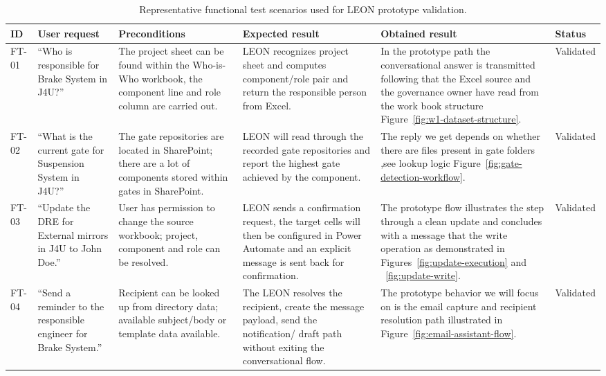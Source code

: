 \begin{table}[H]
\centering
\footnotesize
\renewcommand{\arraystretch}{1.25}
\caption{Representative functional test scenarios used for LEON prototype validation.}
\label{tab:functional-validation-scenarios}
\begin{tabularx}{\textwidth}{|p{0.9cm}|p{2.9cm}|p{2.6cm}|X|X|p{1.8cm}|}
\hline
\rowcolor[HTML]{E6F2FF}\textcolor[HTML]{003D99}{\textbf{ID}} & \textcolor[HTML]{003D99}{\textbf{User request}} & \textcolor[HTML]{003D99}{\textbf{Preconditions}} & \textcolor[HTML]{003D99}{\textbf{Expected result}} & \textcolor[HTML]{003D99}{\textbf{Obtained result}} & \textcolor[HTML]{003D99}{\textbf{Status}} \\
\hline
FT-01 & ``Who is responsible for Brake System in J4U?'' & The project sheet can be found within the Who-is-Who workbook, the component line and role column are carried out. & LEON recognizes project sheet and computes component/role pair and return the responsible person from Excel. & In the prototype path the conversational answer is transmitted following that the Excel source and the governance owner have read from the work book structure Figure~\ref{fig:w1-dataset-structure}. & Validated \\
\hline
FT-02 & ``What is the current gate for Suspension System in J4U?'' & The gate repositories are located in SharePoint; there are a lot of components stored within gates in SharePoint. & LEON will read through the recorded gate repositories and report the highest gate achieved by the component. & The reply we get depends on whether there are files present in gate folders ,see lookup logic Figure~\ref{fig:gate-detection-workflow}. & Validated \\
\hline
FT-03 & ``Update the DRE for External mirrors in J4U to John Doe.'' & User has permission to change the source workbook; project, component and role can be resolved. & LEON sends a confirmation request, the target cells will then be configured in Power Automate and an explicit message is sent back for confirmation. & The prototype flow illustrates the step through a clean update and concludes with a message that the write operation as demonstrated in Figures~\ref{fig:update-execution} and ~\ref{fig:update-write}. & Validated \\
\hline
FT-04 & ``Send a reminder to the responsible engineer for Brake System.'' & Recipient can be looked up from directory data; available subject/body or template data available. & The LEON resolves the recipient, create the message payload, send the notification/ draft path without exiting the conversational flow. & The prototype behavior we will focus on is the email capture and recipient resolution path illustrated in Figure~\ref{fig:email-assistant-flow}. & Validated \\

\end{tabularx}
\end{table}
